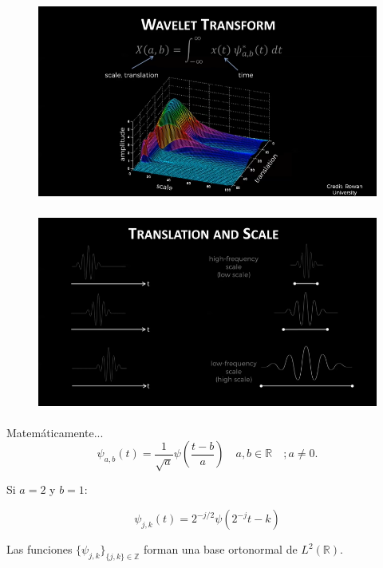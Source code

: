 \documentclass{beamer}
\begin{document}
\begin{frame}
\begin{figure}
\centering
\includegraphics[width=\textwidth, height=6.5cm]{imgs/FvsW4}
\end{figure}
\end{frame}

\begin{frame}
\begin{figure}
\centering
\includegraphics[width=\textwidth, height=6.5cm]{imgs/FvsW5}
\end{figure}
\end{frame}

\begin{frame}

\begin{block}{Matemáticamente...}
\begin{equation}
\psi_{a,b}(t)= \frac{1}{\sqrt{a}} \psi \left( \frac{t-b}{a} \right) \quad a,b \in \mathbb{R} \quad ; a \not = 0. 
\end{equation}


Si $a=2$ y $b=1$:

\begin{equation}
\psi_{j,k}(t) = 2^{-j/2} \psi (2^{-j} t-k )
\end{equation}

Las funciones $\{\psi_{j,k}\}_{\{j,k\} \in \mathbb Z }$ forman una base ortonormal de $L^2(\mathbb R)$.
\end{block}

\end{frame}
    
\end{document}
